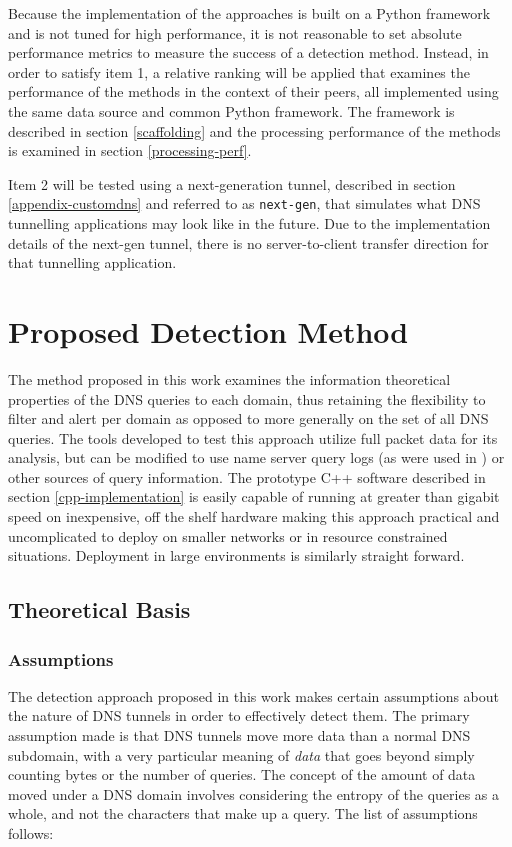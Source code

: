\documentclass[12pt]{report}
\theoremstyle{remark}
\theoremstyle{definition}
\theoremstyle{definition}
\theoremstyle{definition}
\begin{document}
Because the implementation of the approaches is built on a Python framework and
is not tuned for high performance, it is not reasonable to set absolute
performance metrics to measure the success of a detection method. Instead, in
order to satisfy item 1, a relative ranking will be applied that examines the
performance of the methods in the context of their peers, all implemented using
the same data source and common Python framework. The framework is described in
section \ref{scaffolding} and the processing performance of the methods is
examined in section \ref{processing-perf}.

Item 2 will be tested using a next-generation tunnel, described in section
\ref{appendix-customdns} and referred to as \texttt{next-gen}, that simulates
what DNS tunnelling applications may look like in the future. Due to the
implementation details of the next-gen tunnel, there is no server-to-client
transfer direction for that tunnelling application.

\chapter{Proposed Detection Method}
\label{proposed-method}

The method proposed in this work examines the information theoretical properties
of the DNS queries to each domain, thus retaining the flexibility to filter
and alert per domain as opposed to more generally on the set of all DNS queries.
The tools developed to test this approach utilize full packet data for its
analysis, but can be modified to use name server query logs (as were used in
\cite{Romana2007}) or other sources of query information. The prototype C++ software described in section \ref{cpp-implementation}
is easily capable of running at greater than gigabit speed on inexpensive, off
the shelf hardware making this approach practical and uncomplicated to deploy on
smaller networks or in resource constrained situations. Deployment in large
environments is similarly straight forward.

\section{Theoretical Basis}
\subsection{Assumptions}
The detection approach proposed in this work
makes certain assumptions about the nature of DNS tunnels in order to
effectively detect them. The primary assumption made is that DNS tunnels move
more data than a normal DNS subdomain, with a very particular meaning of
\emph{data} that goes beyond simply counting bytes or the number of queries. The
concept of the amount of data moved under a DNS domain involves considering the
entropy of the queries as a whole, and not the characters that make up a query.
The list of assumptions follows:
\end{document}
